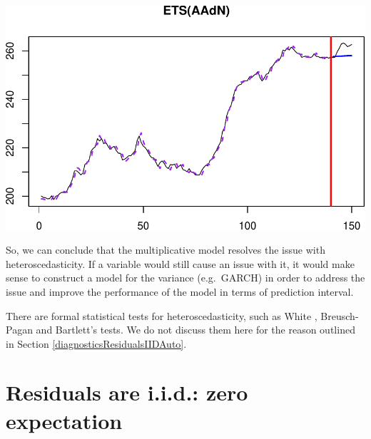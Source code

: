 \documentclass[
]{book}
\theoremstyle{definition}
\theoremstyle{definition}
\theoremstyle{definition}
\theoremstyle{definition}
\theoremstyle{remark}
\begin{document}
\includegraphics{adam_files/figure-latex/unnamed-chunk-165-1.pdf}

So, we can conclude that the multiplicative model resolves the issue with heteroscedasticity. If a variable would still cause an issue with it, it would make sense to construct a model for the variance (e.g.~GARCH) in order to address the issue and improve the performance of the model in terms of prediction interval.

There are formal statistical tests for heteroscedasticity, such as White \citep{WikipediaWhite2021}, Breusch-Pagan \citep{WikipediaBreuschPagan2021} and Bartlett's \citep{WikipediaBartlett2021} tests. We do not discuss them here for the reason outlined in Section \ref{diagnosticsResidualsIIDAuto}.

\hypertarget{diagnosticsResidualsIIDExpectation}{%
\section{Residuals are i.i.d.: zero expectation}\label{diagnosticsResidualsIIDExpectation}}
\end{document}

